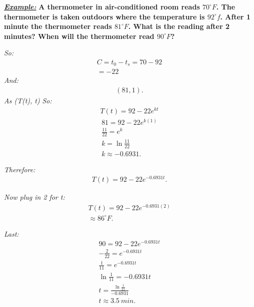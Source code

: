 \documentclass{report}
\begin{document}
    \bigbreak \noindent 
    \begin{mdframed}
      \textbf{\textit{\underline{Example:}}} \textbf{A thermometer in air-conditioned room
        reads $70^{\circ}F$. The thermometer is taken outdoors where the temperature is $92^{\circ}f$.
        After 1 minute the thermometer reads $81^{\circ}F$. What is the reading after 2 minutes? When will
        the thermometer read $90^{\circ}F$?
      }
    \end{mdframed}
    \bigbreak \noindent
    \textit{So:}
    \begin{align*}
      C =  t_0 - t_s = 70-92\\
      = -22
    \end{align*}
    \bigbreak \noindent 
    \textit{And:}
    \begin{align*}
      (81,1)
    .\end{align*}
    \bigbreak \noindent 
    \textit{As (T(t), t)}
    \bigbreak \noindent
    \textit{So:}
    \begin{align*}
      T(t) = 92 - 22e^{kt}      
    \end{align*}
    \begin{align*}
      81 = 92-22e^{k(1)} \\
      \frac{11}{22} = e^{k} \\
      k = \ln{\frac{11}{22}} \\
      k \approx -0.6931
    .\end{align*}

    \bigbreak \noindent 
    \textit{Therefore:}
    \begin{align*}
      T(t) = 92 -22e^{-0.6931t}
    .\end{align*}

    \bigbreak \noindent 
    \textit{Now plug in 2 for t:}
    \begin{align*}
      T(t) = 92-22e^{-0.6931(2)} \\
      \approx 86^{\circ}F
    .\end{align*}

    \bigbreak \noindent 
    \textit{Last:}
    \begin{align*}
      90 = 92- 22e^{-0.6931t} \\ 
      -\frac{2}{22} = e^{-0.6931t} \\
      \frac{1}{11} = e^{-0.6931t} \\
      \ln{\frac{1}{11}} = -0.6931t \\
      t = \frac{\ln{\frac{1}{11}}}{-0.6931} \\
      t  \approx 3.5\ min
    .\end{align*}
\end{document}
